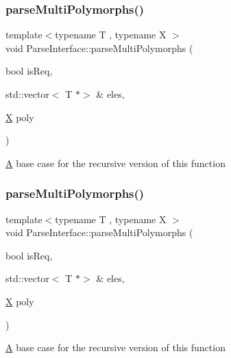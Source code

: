 \subsubsection{\texorpdfstring{parse\+Multi\+Polymorphs()}{parseMultiPolymorphs()}\hspace{0.1cm}{\footnotesize\ttfamily [5/6]}}
{\footnotesize\ttfamily template$<$typename T , typename X $>$ \\
void Parse\+Interface\+::parse\+Multi\+Polymorphs (\begin{DoxyParamCaption}\item[{bool}]{is\+Req,  }\item[{std\+::vector$<$ T $\ast$$>$ \&}]{eles,  }\item[{\hyperlink{classX}{X}}]{poly }\end{DoxyParamCaption})}

\hyperlink{classA}{A} base case for the recursive version of this function \mbox{\label{classParseInterface_a3d1afd8bdd00110808e3c42320556544}} 
\subsubsection{\texorpdfstring{parse\+Multi\+Polymorphs()}{parseMultiPolymorphs()}\hspace{0.1cm}{\footnotesize\ttfamily [6/6]}}
{\footnotesize\ttfamily template$<$typename T , typename X $>$ \\
void Parse\+Interface\+::parse\+Multi\+Polymorphs (\begin{DoxyParamCaption}\item[{bool}]{is\+Req,  }\item[{std\+::vector$<$ T $\ast$$>$ \&}]{eles,  }\item[{\hyperlink{classX}{X}}]{poly }\end{DoxyParamCaption})}

\hyperlink{classA}{A} base case for the recursive version of this function \mbox{\label{classParseInterface_ab6ffc29634def5ea16a7a30998cc15f8}} 
